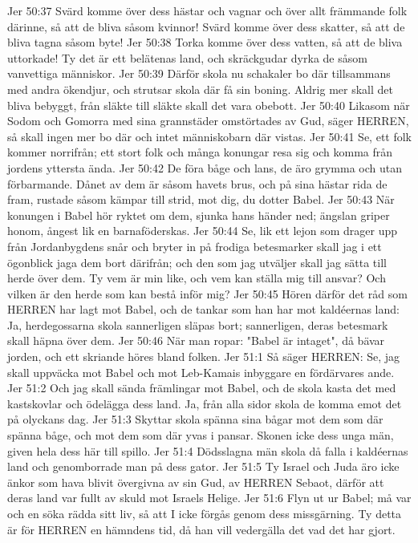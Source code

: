 Jer 50:37  Svärd komme över dess hästar och vagnar och över allt främmande folk därinne, så att de bliva såsom kvinnor! Svärd komme över dess skatter, så att de bliva tagna såsom byte!
Jer 50:38  Torka komme över dess vatten, så att de bliva uttorkade! Ty det är ett belätenas land, och skräckgudar dyrka de såsom vanvettiga människor.
Jer 50:39  Därför skola nu schakaler bo där tillsammans med andra ökendjur, och strutsar skola där få sin boning. Aldrig mer skall det bliva bebyggt, från släkte till släkte skall det vara obebott.
Jer 50:40  Likasom när Sodom och Gomorra med sina grannstäder omstörtades av Gud, säger HERREN, så skall ingen mer bo där och intet människobarn där vistas.
Jer 50:41  Se, ett folk kommer norrifrån; ett stort folk och många konungar resa sig och komma från jordens yttersta ända.
Jer 50:42  De föra båge och lans, de äro grymma och utan förbarmande. Dånet av dem är såsom havets brus, och på sina hästar rida de fram, rustade såsom kämpar till strid, mot dig, du dotter Babel.
Jer 50:43  När konungen i Babel hör ryktet om dem, sjunka hans händer ned; ängslan griper honom, ångest lik en barnaföderskas.
Jer 50:44  Se, lik ett lejon som drager upp från Jordanbygdens snår och bryter in på frodiga betesmarker skall jag i ett ögonblick jaga dem bort därifrån; och den som jag utväljer skall jag sätta till herde över dem. Ty vem är min like, och vem kan ställa mig till ansvar? Och vilken är den herde som kan bestå inför mig?
Jer 50:45  Hören därför det råd som HERREN har lagt mot Babel, och de tankar som han har mot kaldéernas land: Ja, herdegossarna skola sannerligen släpas bort; sannerligen, deras betesmark skall häpna över dem.
Jer 50:46  När man ropar: "Babel är intaget", då bävar jorden, och ett skriande höres bland folken.
Jer 51:1  Så säger HERREN: Se, jag skall uppväcka mot Babel och mot Leb-Kamais inbyggare en fördärvares ande.
Jer 51:2  Och jag skall sända främlingar mot Babel, och de skola kasta det med kastskovlar och ödelägga dess land. Ja, från alla sidor skola de komma emot det på olyckans dag.
Jer 51:3  Skyttar skola spänna sina bågar mot dem som där spänna båge, och mot dem som där yvas i pansar. Skonen icke dess unga män, given hela dess här till spillo.
Jer 51:4  Dödsslagna män skola då falla i kaldéernas land och genomborrade man på dess gator.
Jer 51:5  Ty Israel och Juda äro icke änkor som hava blivit övergivna av sin Gud, av HERREN Sebaot, därför att deras land var fullt av skuld mot Israels Helige.
Jer 51:6  Flyn ut ur Babel; må var och en söka rädda sitt liv, så att I icke förgås genom dess missgärning. Ty detta är för HERREN en hämndens tid, då han vill vedergälla det vad det har gjort.
